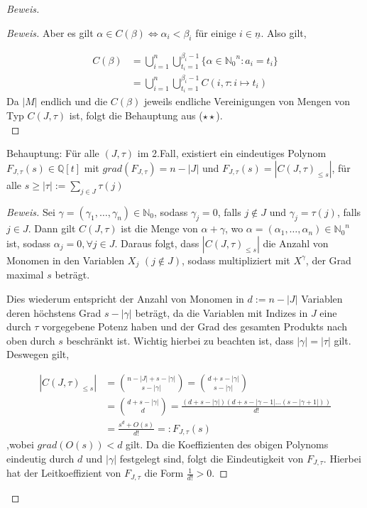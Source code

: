 \documentclass{article}
\newcommand*{\indx}[2]{{#1}_{#2}}
\newcommand*{\potx}[2]{{#1}^{#2}}
\newcommand*{\N}{\mathbb{N}_0}
\begin{document}
\begin{proof}[Beweis]
\begin{compactenum}
\begin{proof}[Beweis]
			Aber es gilt $\alpha \in C(\beta)\Leftrightarrow \indx{\alpha}{i}<\indx{\beta}{i}$ für einige $i\in\underline{n}$. Also gilt,
			
			
			\begin{align*}
			C(\beta)&=\bigcup\limits_{i=1}^{n}\bigcup\limits_{t_{i}=1}^{\indx{\beta}{i}-1}\{\alpha\in \potx{\N}{n}:\indx{a}{i}=\indx{t}{i}\}\\&
			=\bigcup\limits_{i=1}^{n}\bigcup\limits_{t_{i}=1}^{\indx{\beta}{i}-1} C({i},\tau:i\mapsto \indx{t}{i})
			\end{align*}
			Da $\left|M\right|$ endlich und die $C(\beta)$ jeweils endliche Vereinigungen von Mengen von Typ $C(J,\tau)$ ist, folgt die Behauptung aus ($\star \star$).\\
		\end{proof}
		\item Behauptung: Für alle $(J,\tau)$ im 2.Fall, existiert ein eindeutiges Polynom $\indx{F}{J,\tau}(s)\in \mathbb{Q}[t]$ mit $grad(\indx{F}{J,\tau})=n-|J|$ und
		$\indx{F}{J,\tau}(s)=\left|\indx{C(J,\tau)}{\leq s}\right|$, für alle $s\geq |\tau|:=\sum\limits_{j\in J}\tau(j)$\\
		
		\begin{proof}[Beweis]
			Sei $\gamma=(\indx{\gamma}{1},\ldots,\indx{\gamma}{n}) \in \N$, sodass $\indx{\gamma}{j}=0$, falls $j\notin J$ und $\indx{\gamma}{j}=\tau(j)$, falls $j\in J$. Dann gilt $C(J,\tau)$ ist die Menge von $\alpha+\gamma$, wo  $\alpha=(\indx{\alpha}{1},\ldots,\indx{\alpha}{n}) \in \potx{\N}{n}$ ist, sodass $\indx{\alpha}{j}=0, \forall j \in J$. Daraus folgt, dass $\left|\indx{C(J,\tau)}{\leq s}\right|$ die Anzahl von Monomen in den Variablen $\indx{X}{j}$ $(j\notin J)$, sodass multipliziert mit $\potx{X}{\gamma}$, der Grad maximal $s$ beträgt.
			
			Dies wiederum entspricht der Anzahl von Monomen in $d:=n-\left|J\right|$ Variablen deren höchstens Grad $s-\left|\gamma\right|$ beträgt, da die Variablen mit Indizes in $J$ eine durch $\tau$ vorgegebene Potenz haben und der Grad des gesamten Produkts nach oben durch $s$ beschränkt ist. Wichtig hierbei zu beachten ist, dass $\left|\gamma\right|=\left|\tau\right|$ gilt. Deswegen gilt,
			
			\begin{align*}
			\left|\indx{C(J,\tau)}{\leq s}\right|&=\binom{n-\left|J\right|+s-\left|\gamma\right|}{s-\left|\gamma\right|}=\binom{d+s-\left|\gamma\right|}{s-\left|\gamma\right|}\\&
			=\binom{d+s-\left|\gamma\right|}{d}=\frac{(d+s-\left|\gamma\right|)(d+s-\left|\gamma-1\right|\ldots(s-\left|\gamma+1\right|))}{d!}\\&
			=\frac{s^d+O(s)}{d!}=:\indx{F}{J,\tau}(s)
			\end{align*}
			,wobei $grad(O(s))<d$ gilt.	Da die Koeffizienten des obigen Polynoms eindeutig durch $d$  und $|\gamma|$ festgelegt sind, folgt die Eindeutigkeit von $\indx{F}{J,\tau}$. Hierbei hat der Leitkoeffizient von $\indx{F}{J,\tau}$ die Form $\frac{1}{d!}>0$.
		\end{proof}
		

\end{compactenum}
\end{proof}
\end{document}
